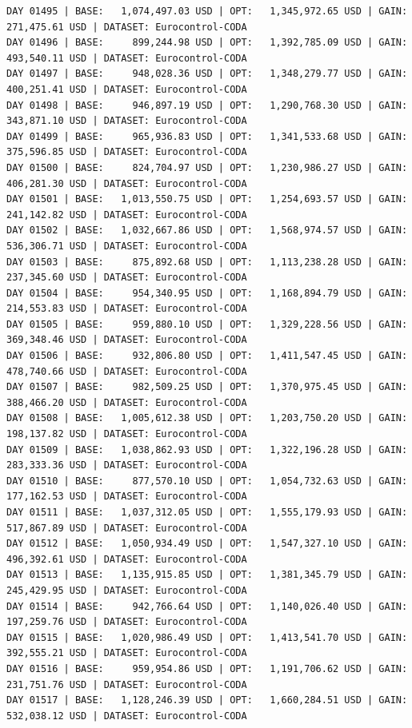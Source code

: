 \documentclass[11pt,a4paper]{article}
\begin{document}
\begin{verbatim}
DAY 01495 | BASE:   1,074,497.03 USD | OPT:   1,345,972.65 USD | GAIN: 271,475.61 USD | DATASET: Eurocontrol-CODA
DAY 01496 | BASE:     899,244.98 USD | OPT:   1,392,785.09 USD | GAIN: 493,540.11 USD | DATASET: Eurocontrol-CODA
DAY 01497 | BASE:     948,028.36 USD | OPT:   1,348,279.77 USD | GAIN: 400,251.41 USD | DATASET: Eurocontrol-CODA
DAY 01498 | BASE:     946,897.19 USD | OPT:   1,290,768.30 USD | GAIN: 343,871.10 USD | DATASET: Eurocontrol-CODA
DAY 01499 | BASE:     965,936.83 USD | OPT:   1,341,533.68 USD | GAIN: 375,596.85 USD | DATASET: Eurocontrol-CODA
DAY 01500 | BASE:     824,704.97 USD | OPT:   1,230,986.27 USD | GAIN: 406,281.30 USD | DATASET: Eurocontrol-CODA
DAY 01501 | BASE:   1,013,550.75 USD | OPT:   1,254,693.57 USD | GAIN: 241,142.82 USD | DATASET: Eurocontrol-CODA
DAY 01502 | BASE:   1,032,667.86 USD | OPT:   1,568,974.57 USD | GAIN: 536,306.71 USD | DATASET: Eurocontrol-CODA
DAY 01503 | BASE:     875,892.68 USD | OPT:   1,113,238.28 USD | GAIN: 237,345.60 USD | DATASET: Eurocontrol-CODA
DAY 01504 | BASE:     954,340.95 USD | OPT:   1,168,894.79 USD | GAIN: 214,553.83 USD | DATASET: Eurocontrol-CODA
DAY 01505 | BASE:     959,880.10 USD | OPT:   1,329,228.56 USD | GAIN: 369,348.46 USD | DATASET: Eurocontrol-CODA
DAY 01506 | BASE:     932,806.80 USD | OPT:   1,411,547.45 USD | GAIN: 478,740.66 USD | DATASET: Eurocontrol-CODA
DAY 01507 | BASE:     982,509.25 USD | OPT:   1,370,975.45 USD | GAIN: 388,466.20 USD | DATASET: Eurocontrol-CODA
DAY 01508 | BASE:   1,005,612.38 USD | OPT:   1,203,750.20 USD | GAIN: 198,137.82 USD | DATASET: Eurocontrol-CODA
DAY 01509 | BASE:   1,038,862.93 USD | OPT:   1,322,196.28 USD | GAIN: 283,333.36 USD | DATASET: Eurocontrol-CODA
DAY 01510 | BASE:     877,570.10 USD | OPT:   1,054,732.63 USD | GAIN: 177,162.53 USD | DATASET: Eurocontrol-CODA
DAY 01511 | BASE:   1,037,312.05 USD | OPT:   1,555,179.93 USD | GAIN: 517,867.89 USD | DATASET: Eurocontrol-CODA
DAY 01512 | BASE:   1,050,934.49 USD | OPT:   1,547,327.10 USD | GAIN: 496,392.61 USD | DATASET: Eurocontrol-CODA
DAY 01513 | BASE:   1,135,915.85 USD | OPT:   1,381,345.79 USD | GAIN: 245,429.95 USD | DATASET: Eurocontrol-CODA
DAY 01514 | BASE:     942,766.64 USD | OPT:   1,140,026.40 USD | GAIN: 197,259.76 USD | DATASET: Eurocontrol-CODA
DAY 01515 | BASE:   1,020,986.49 USD | OPT:   1,413,541.70 USD | GAIN: 392,555.21 USD | DATASET: Eurocontrol-CODA
DAY 01516 | BASE:     959,954.86 USD | OPT:   1,191,706.62 USD | GAIN: 231,751.76 USD | DATASET: Eurocontrol-CODA
DAY 01517 | BASE:   1,128,246.39 USD | OPT:   1,660,284.51 USD | GAIN: 532,038.12 USD | DATASET: Eurocontrol-CODA

\end{verbatim}
\end{document}
